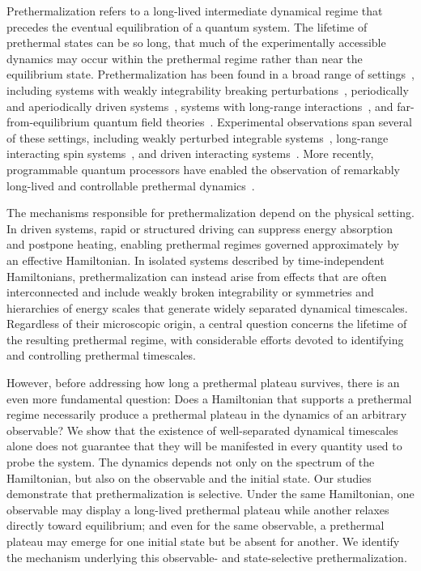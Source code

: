 \documentclass[aps,prl,amsfonts,floatfix,superscriptaddress,longbibliography,twocolumn,footinbib]{revtex4-2}
\begin{document}
Prethermalization refers to a long-lived intermediate dynamical regime that precedes the eventual equilibration of a quantum system. The lifetime of prethermal states can be so long, that much of the experimentally accessible dynamics may occur within the prethermal regime rather than near the equilibrium state.  Prethermalization has been found in a broad range of settings~\cite{Barnett2011,Kollar2011,Babadi2015,Alba2017,Abanin2017,Mori2018,Reimann2019_01,Yin2023,Gallone2026}, including systems with weakly integrability breaking perturbations~\cite{Bertini2015,Else2017,Mallayya2019,Mallayya2021}, periodically and aperiodically driven systems~\cite{Kuwahara2016,Ho2018,Dumitrescu2018,Machado2019,Machado2020,Mori2021,Santos2021,Bhakuni2021,Das2023,Dea2024,Tiwari2025}, systems with long-range interactions~\cite{Kastner2010,Schutz2014,Schutz2016,Mori2019,Defenu2024_1,ArrufatVicente2025,Manju2026}, and far-from-equilibrium quantum field theories~\cite{Halimeh2020,Hayata2024}. Experimental observations span several of these settings, including weakly perturbed integrable systems~\cite{Tang2018}, long-range interacting spin systems~\cite{Neyenhuise2017}, and driven interacting systems~\cite{Wei2019,Peng2021,Rubio2020}. More recently, programmable quantum processors have enabled the observation of remarkably long-lived and controllable prethermal dynamics~\cite{Bao2026,Liu2026}.

The mechanisms responsible for prethermalization depend on the physical setting. In driven systems, rapid or structured driving can suppress energy absorption and postpone heating, enabling prethermal regimes governed approximately by an effective Hamiltonian. In isolated systems described by time-independent Hamiltonians, prethermalization can instead arise from effects that are often interconnected and include weakly broken integrability or symmetries and hierarchies of energy scales that generate widely separated dynamical timescales. Regardless of their microscopic origin, a central question concerns the lifetime of the resulting prethermal regime, with considerable efforts devoted to identifying and controlling prethermal timescales.

However, before addressing how long a prethermal plateau survives, there is an even more fundamental question: Does a Hamiltonian that supports a prethermal regime necessarily produce a prethermal plateau in the dynamics of an arbitrary observable? We show that the existence of well-separated dynamical timescales alone does not guarantee that they will be manifested in every quantity used to probe the system. The dynamics depends not only on the spectrum of the Hamiltonian, but also on the observable and the initial state. Our studies demonstrate that prethermalization is selective. Under the same Hamiltonian, one observable may display a long-lived prethermal plateau while another relaxes directly toward equilibrium; and even for the same observable, a prethermal plateau may emerge for one initial state but be absent for another. We identify the mechanism underlying this observable- and state-selective prethermalization.
\end{document}
